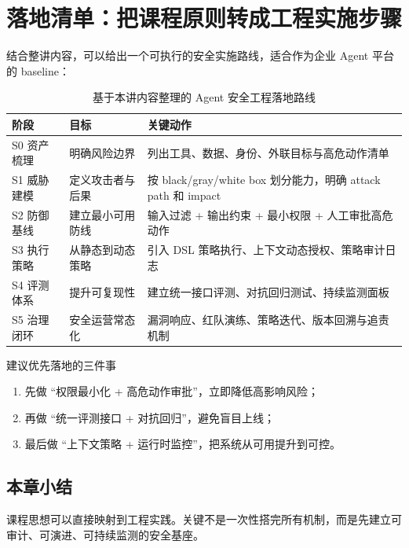 \section{落地清单：把课程原则转成工程实施步骤}

结合整讲内容，可以给出一个可执行的安全实施路线，适合作为企业 Agent 平台的 baseline：

\begin{table}[H]
\centering
\begin{tabular}{p{1.7cm}p{3.1cm}p{5.8cm}}
\toprule
\textbf{阶段} & \textbf{目标} & \textbf{关键动作} \\
\midrule
S0 资产梳理 & 明确风险边界 & 列出工具、数据、身份、外联目标与高危动作清单 \\
S1 威胁建模 & 定义攻击者与后果 & 按 black/gray/white box 划分能力，明确 attack path 和 impact \\
S2 防御基线 & 建立最小可用防线 & 输入过滤 + 输出约束 + 最小权限 + 人工审批高危动作 \\
S3 执行策略 & 从静态到动态策略 & 引入 DSL 策略执行、上下文动态授权、策略审计日志 \\
S4 评测体系 & 提升可复现性 & 建立统一接口评测、对抗回归测试、持续监测面板 \\
S5 治理闭环 & 安全运营常态化 & 漏洞响应、红队演练、策略迭代、版本回溯与追责机制 \\
\bottomrule
\end{tabular}
\caption{基于本讲内容整理的 Agent 安全工程落地路线}
\end{table}

\begin{knowledgebox}{建议优先落地的三件事}
\begin{enumerate}
    \item 先做 ``权限最小化 + 高危动作审批''，立即降低高影响风险；
    \item 再做 ``统一评测接口 + 对抗回归''，避免盲目上线；
    \item 最后做 ``上下文策略 + 运行时监控''，把系统从可用提升到可控。
\end{enumerate}
\end{knowledgebox}

\subsection{本章小结}
课程思想可以直接映射到工程实践。关键不是一次性搭完所有机制，而是先建立可审计、可演进、可持续监测的安全基座。


